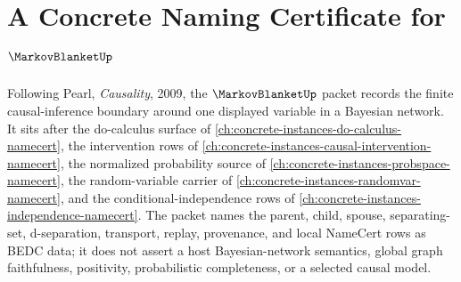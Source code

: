 \chapter{A Concrete Naming Certificate for $\MarkovBlanketUp$}
\label{ch:concrete-instances-markov-blanket-namecert}

Following Pearl, \emph{Causality}, 2009, the $\MarkovBlanketUp$ packet records the finite causal-inference boundary around one displayed variable in a Bayesian network. It sits after the do-calculus surface of \autoref{ch:concrete-instances-do-calculus-namecert}, the intervention rows of \autoref{ch:concrete-instances-causal-intervention-namecert}, the normalized probability source of \autoref{ch:concrete-instances-probspace-namecert}, the random-variable carrier of \autoref{ch:concrete-instances-randomvar-namecert}, and the conditional-independence rows of \autoref{ch:concrete-instances-independence-namecert}. The packet names the parent, child, spouse, separating-set, d-separation, transport, replay, provenance, and local NameCert rows as BEDC data; it does not assert a host Bayesian-network semantics, global graph faithfulness, positivity, probabilistic completeness, or a selected causal model.

